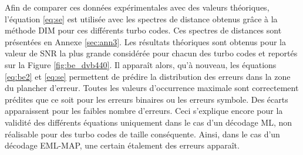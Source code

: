 Afin de comparer ces données expérimentales avec des valeurs théoriques, l'équation \ref{eq:se} est utilisée avec les 
spectres de distance obtenus grâce à la méthode DIM pour ces différents turbo codes. Ces spectres de distances sont 
présentées en Annexe \ref{sec:ann3}. Les résultats théoriques sont obtenus pour la valeur de SNR la plus grande considérée
pour chacun des turbo codes et reportés sur la Figure \ref{fig:be_dvb440}. Il apparaît alors, qu'à nouveau, les équations
\ref{eq:be2} et \ref{eq:se} permettent de prédire la distribution des erreurs dans la zone du plancher d'erreur. 
Toutes les valeurs d’occurrence maximale sont correctement prédites que ce soit pour les erreurs binaires ou les 
erreurs symbole. Des écarts apparaissent pour les faibles nombre d'erreurs. Ceci s'explique encore pour la validité des
différents équations uniquement dans le cas d'un décodage ML, non réalisable pour des turbo codes de taille conséquente.
Ainsi, dans le cas d'un décodage EML-MAP, une certain étalement des erreurs apparaît.

